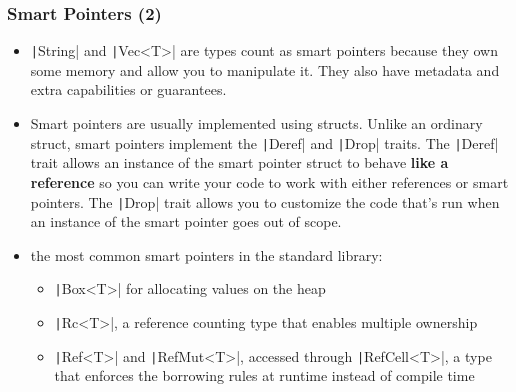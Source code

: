 \documentclass{beamer}
\begin{document}
\begin{frame}[fragile]
	\frametitle{Smart Pointers (2)}
\begin{itemize}
	\item  \texttt|String| and \texttt|Vec<T>| are types count as smart pointers because they own some memory and allow you to manipulate it. They also have metadata and extra capabilities or guarantees. 
	\item  Smart pointers are usually implemented using structs. Unlike an ordinary struct, smart pointers implement the \texttt|Deref| and \texttt|Drop| traits. The \texttt|Deref| trait allows an instance of the smart pointer struct to behave \textbf{like a reference} so you can write your code to work with either references or smart pointers. The \texttt|Drop| trait allows you to customize the code that’s run when an instance of the smart pointer goes out of scope. 
	\item  the most common smart pointers in the standard library:
	\begin{itemize}
		\item \texttt|Box<T>| for allocating values on the heap
		\item 	\texttt|Rc<T>|, a reference counting type that enables multiple ownership
		\item 	\texttt|Ref<T>| and \texttt|RefMut<T>|, accessed through \texttt|RefCell<T>|, a type that enforces the borrowing rules at runtime instead of compile time
	\end{itemize}
\end{itemize}
\end{frame} 
\end{document}
